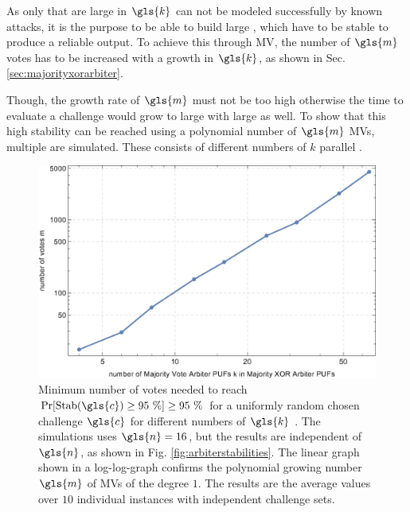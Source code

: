 As only \xpufs that are large in $\gls{k}$ can not be modeled successfully by known attacks, it is the purpose to be able to build large \xpufs, which have to be stable to produce a reliable output. %
To achieve this through \ac{MV}, the number of $\gls{m}$ votes has to be increased with a growth in $\gls{k}$, as shown in Sec. \ref{sec:majorityxorarbiter}.

Though, the growth rate of $\gls{m}$ must not be too high otherwise the time to evaluate a challenge would grow to large with large \xpufs as well. %
To show that this high stability can be reached using a polynomial number of $\gls{m}$ \acp{MV}, multiple \mxpufs are simulated.
These \mxpufs consists of different numbers of $k$ parallel \mpufs.

\begin{figure}[ht]
\includegraphics[width=1.00\textwidth]{images/votes-stab-simulation.eps}
\caption[Number of votes needed for large Majority \acs{XOR} \apufs]{Minimum number of votes needed to reach $\Pr[\protect\Stab(\gls{c}) \ge 95\ \%] \ge 95\ \%$ for a uniformly random chosen challenge $\gls{c}$ for different numbers of $\gls{k}$ \apufs. 
The simulations uses $\gls{n} = 16$, but the results are independent of $\gls{n}$, as shown in Fig. \ref{fig:arbiterstabilities}. 
The linear graph shown in a log-log-graph confirms the polynomial growing number $\gls{m}$ of \acp{MV} of the degree $1$.
The results are the average values over $10$ individual \puf instances with independent challenge sets.} 
\label{fig:majorityvotegrowth}
\end{figure}
\pagebreak

